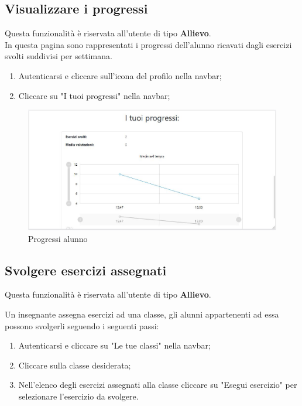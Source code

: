 \documentclass[11pt,a4paper]{article}
\begin{document}
{	\newpage
	\subsection{Visualizzare i progressi}
	Questa funzionalità è riservata all'utente di tipo \textbf{Allievo}.\\
	In questa pagina sono rappresentati i progressi dell'alunno ricavati dagli esercizi svolti suddivisi per settimana.
	
	\begin{enumerate}
		\item Autenticarsi e cliccare sull'icona del profilo nella navbar;
		\item Cliccare su "I tuoi progressi" nella navbar;
	\end{enumerate}

	\begin{figure}[h]
		\centering
		\includegraphics[scale=0.65]{images/progressi.jpg}
		\caption{Progressi alunno}
	\end{figure}	
	
	\newpage
	\subsection{Svolgere esercizi assegnati}
	Questa funzionalità è riservata all'utente di tipo \textbf{Allievo}.
	
	Un insegnante assegna esercizi ad una classe, gli alunni appartenenti ad essa possono svolgerli seguendo i seguenti passi:
	
	\begin{enumerate}
		\item Autenticarsi e cliccare su "Le tue classi" nella navbar;
		\item Cliccare sulla classe desiderata;
		\item Nell'elenco degli esercizi assegnati alla classe cliccare su "Esegui esercizio" per selezionare l'esercizio da svolgere.
	\end{enumerate}

}
\end{document}
